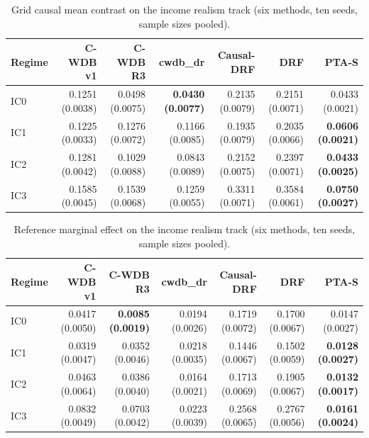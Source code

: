 \begin{table}[htbp]
\centering
\caption{Grid causal mean contrast on the income realism track (six methods, ten seeds, sample sizes pooled).}
\label{tab:p6-income-mean_quantile_rmse}
\small
\begin{tabular}{@{}lrrrrrr@{}}
\toprule
Regime & C-WDB v1 & C-WDB R3 & cwdb\_dr & Causal-DRF & DRF & PTA-S \\ 
\midrule
IC0 & 0.1251 (0.0038) & 0.0498 (0.0075) & \textbf{0.0430 (0.0077)} & 0.2135 (0.0079) & 0.2151 (0.0071) & 0.0433 (0.0021) \\ 
IC1 & 0.1225 (0.0033) & 0.1276 (0.0072) & 0.1166 (0.0085) & 0.1935 (0.0079) & 0.2035 (0.0066) & \textbf{0.0606 (0.0021)} \\ 
IC2 & 0.1281 (0.0042) & 0.1029 (0.0088) & 0.0843 (0.0089) & 0.2152 (0.0075) & 0.2397 (0.0071) & \textbf{0.0433 (0.0025)} \\ 
IC3 & 0.1585 (0.0045) & 0.1539 (0.0068) & 0.1259 (0.0055) & 0.3311 (0.0071) & 0.3584 (0.0061) & \textbf{0.0750 (0.0027)} \\ 
\bottomrule
\end{tabular}
\end{table}


\begin{table}[htbp]
\centering
\caption{Reference marginal effect on the income realism track (six methods, ten seeds, sample sizes pooled).}
\label{tab:p6-income-reference_effect_rmse}
\small
\begin{tabular}{@{}lrrrrrr@{}}
\toprule
Regime & C-WDB v1 & C-WDB R3 & cwdb\_dr & Causal-DRF & DRF & PTA-S \\ 
\midrule
IC0 & 0.0417 (0.0050) & \textbf{0.0085 (0.0019)} & 0.0194 (0.0026) & 0.1719 (0.0072) & 0.1700 (0.0067) & 0.0147 (0.0027) \\ 
IC1 & 0.0319 (0.0047) & 0.0352 (0.0046) & 0.0218 (0.0035) & 0.1446 (0.0067) & 0.1502 (0.0059) & \textbf{0.0128 (0.0027)} \\ 
IC2 & 0.0463 (0.0064) & 0.0386 (0.0040) & 0.0164 (0.0021) & 0.1713 (0.0069) & 0.1905 (0.0067) & \textbf{0.0132 (0.0017)} \\ 
IC3 & 0.0832 (0.0049) & 0.0703 (0.0042) & 0.0223 (0.0039) & 0.2568 (0.0065) & 0.2767 (0.0056) & \textbf{0.0161 (0.0024)} \\ 
\bottomrule
\end{tabular}
\end{table}


